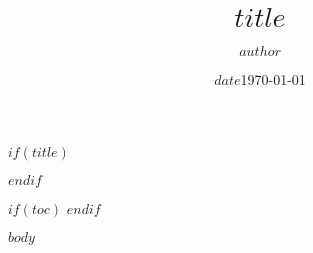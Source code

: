 \documentclass[b4paper,11pt,twocolumn]{article}
\title{$title$}
\author{$author$}
\date{$date$}
\date{\today}
\begin{document}
$if(title)$
\maketitle
$endif$

$if(toc)$
\tableofcontents
\newpage
$endif$

$body$
\end{document}
